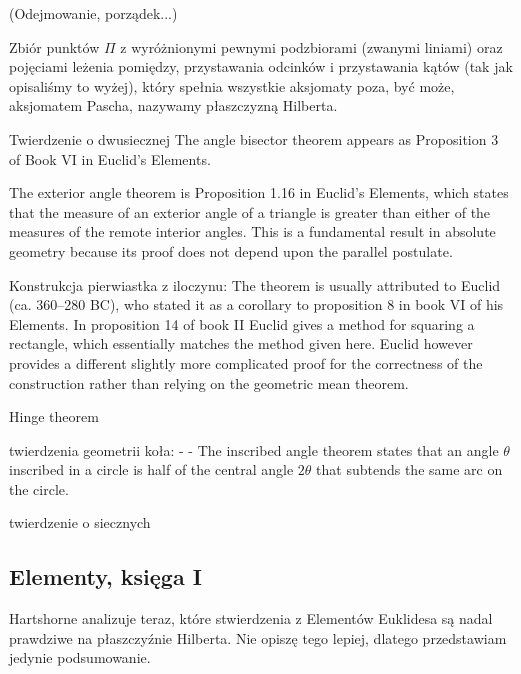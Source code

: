 {(Odejmowanie, porządek...)

\begin{definition}
	Zbiór punktów $\Pi$ z wyróżnionymi pewnymi podzbiorami (zwanymi liniami) oraz pojęciami leżenia pomiędzy, przystawania odcinków i przystawania kątów (tak jak opisaliśmy to wyżej), który spełnia wszystkie aksjomaty poza, być może, aksjomatem Pascha, nazywamy płaszczyzną Hilberta.
\end{definition}


Twierdzenie o dwusiecznej %
The angle bisector theorem appears as Proposition 3 of Book VI in Euclid's Elements. 

The exterior angle theorem is Proposition 1.16 in Euclid's Elements, which states that the measure of an exterior angle of a triangle is greater than either of the measures of the remote interior angles. This is a fundamental result in absolute geometry because its proof does not depend upon the parallel postulate. %

Konstrukcja pierwiastka z iloczynu:
The theorem is usually attributed to Euclid (ca. 360–280 BC), who stated it as a corollary to proposition 8 in book VI of his Elements. In proposition 14 of book II Euclid gives a method for squaring a rectangle, which essentially matches the method given here. Euclid however provides a different slightly more complicated proof for the correctness of the construction rather than relying on the geometric mean theorem.


Hinge theorem %

twierdzenia geometrii koła:
- %
- The inscribed angle theorem states that an angle $\theta$ inscribed in a circle is half of the central angle $2\theta$ that subtends the same arc on the circle. 



twierdzenie o siecznych


\subsection{Elementy, księga I}
Hartshorne analizuje teraz, które stwierdzenia z Elementów Euklidesa są nadal prawdziwe na płaszczyźnie Hilberta.
Nie opiszę tego lepiej, dlatego przedstawiam jedynie podsumowanie.

}
